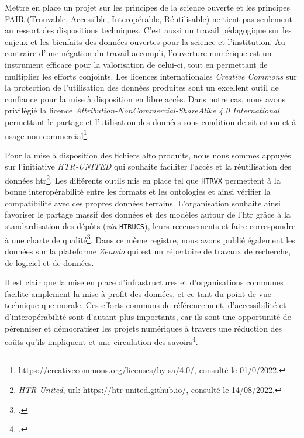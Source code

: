 	Mettre en place un projet sur les principes de la science ouverte et les principes FAIR (Trouvable, Accessible, Interopérable, Réutilisable) ne tient pas seulement au ressort des dispositions techniques. C'est aussi un travail pédagogique sur les enjeux et les bienfaits des données ouvertes pour la science et l'institution. Au contraire d'une négation du travail accompli, l'ouverture numérique est un instrument efficace pour la valorisation de celui-ci, tout en permettant de multiplier les efforts conjoints. Les licences internationales \textit{Creative Commons} sur la protection de l'utilisation des données produites sont un excellent outil de confiance pour la mise à disposition en libre accès. Dans notre cas, nous avons privilégié la licence \textit{Attribution-NonCommercial-ShareAlike 4.0 International} permettant le partage et l'utilisation des données sous condition de situation et à usage non commercial\footnote{\url{https://creativecommons.org/licenses/by-sa/4.0/}, consulté le 01/0/2022.}.
	
	Pour la mise à disposition des fichiers \gls{alto} produits, nous nous sommes appuyés sur l'initiative \textit{HTR-UNITED} qui souhaite faciliter l'accès et la réutilisation des données \gls{htr}\footnote{\textit{HTR-United}, url: \url{https://htr-united.github.io/}, consulté le 14/08/2022.}. Les différents outils mis en place tel que \texttt{HTRVX} permettent à la bonne interopérabilité entre les formats et les ontologies et ainsi vérifier la compatibilité avec ces propres données terrains. L'organisation souhaite ainsi favoriser le partage massif des données et  des modèles autour de l'\gls{htr} grâce à la standardisation des dépôts (\textit{via} \texttt{HTRUCS}), leurs recensements et faire correspondre à une charte de qualité\footcite{chagueConditionsMutualisationPrincipes2022}. Dans ce même registre, nous avons publié également les données sur la plateforme \textit{Zenodo} qui est un répertoire de travaux de recherche, de logiciel et de données.
	
	Il est clair que la mise en place d'infrastructures et d'organisations communes facilite amplement la mise à profit des données, et ce tant du point de vue technique que morale. Ces efforts communs de référencement, d'accessibilité et d'interopérabilité sont d'autant plus importants, car ils sont une opportunité de pérenniser et démocratiser les projets numériques à travers une réduction des coûts qu'ils impliquent et une circulation des savoirs\footcite{chagueConditionsMutualisationPrincipes2022}.
	
